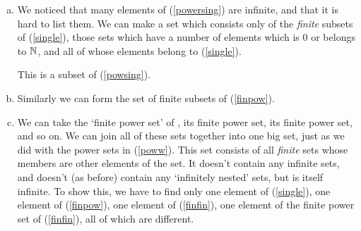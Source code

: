 \begin{enumerate}[(a)]
This is not the same as (\ref{powersing}). All members of (\ref{powersing}) contain only singleton sets. This set contains sets whose members have all sizes, including infinite. In fact this set is made up of all the elements of (\ref{single}), all the elements of (\ref{powersing}), the power set of (\ref{single}), as well as all the elements of the power set of (\ref{powersing}), the power set of the power set of (\ref{powersing}), the power set of the power set of the power set of (\ref{powersing}), and so on. The first one contains only singletons, the second one contains only sets which contain singletons, the third one contains only sets which contain sets which contain singletons, and so on. Note that none of the members of this set are `infinitely nested', ie there is no
\[ \{\{\{\{\{\ldots\}\}\}\}\} \]
where the brackets go on forever.\footnote{We will decide later if such a thing exists and/or is really a set, but for now we just need to know that we exclude it, and any similar things, from our current set.} We have things of all finite amounts of nesting, but no infinite nesting. This is like when we constructed all the natural numbers (infinitely many), but each of the numbers itself was `finite'.
\item\label{finpow}
We noticed that many elements of (\ref{powersing}) are infinite, and that it is hard to list them. We can make a set which consists only of the \emph{finite} subsets of (\ref{single}), those sets which have a number of elements which is $0$ or belongs to $\mathbb{N}$, and all of whose elements belong to (\ref{single}).

This is a subset of (\ref{powsing}).
\item\label{finfin}
Similarly we can form the set of finite subsets of (\ref{finpow}).
\item\label{finw}
We can take the `finite power set' of \label{finfin}, its finite power set, its finite power set, and so on. We can join all of these sets together into one big set, just as we did with the power sets in (\ref{poww}). This set consists of all \emph{finite} sets whose members are other elements of the set. It doesn't contain any infinite sets, and doesn't (as before) contain any `infinitely nested' sets, but is itself infinite. To show this, we have to find only one element of (\ref{single}), one element of (\ref{finpow}), one element of (\ref{finfin}), one element of the finite power set of (\ref{finfin}), all of which are different.
\end{enumerate} 
